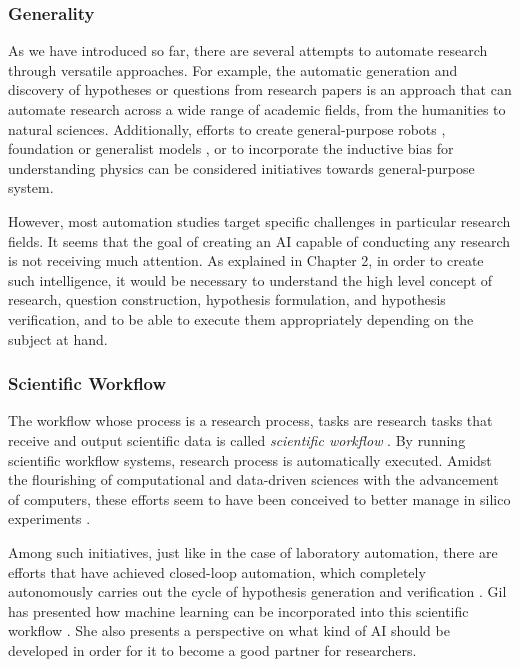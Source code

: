 

\subsubsection{Generality}
As we have introduced so far, there are several attempts to automate research through versatile approaches. For example, the automatic generation and discovery of hypotheses \cite{kang2022augmenting,chan2018solvent,wang2023learning,xu2023exploring} or questions \cite{lahat2023evaluating,liu2023creative,oppenlaender2023mapping,surita2020can} from research papers is an approach that can automate research across a wide range of academic fields, from the humanities to natural sciences. Additionally, efforts to create general-purpose robots  \cite{yachie2017robotic}, foundation or generalist models \cite{singhal2023towards,taylor2022galactica}, or to incorporate the inductive bias for understanding physics can be considered initiatives towards general-purpose system.

However, most automation studies target specific challenges in particular research fields. It seems that the goal of creating an AI capable of conducting any research is not receiving much attention. As explained in Chapter 2, in order to create such intelligence, it would be necessary to understand the high level concept of research, question construction, hypothesis formulation, and hypothesis verification, and to be able to execute them appropriately depending on the subject at hand.

\subsubsection{Scientific Workflow}
The workflow whose process is a research process, tasks are research tasks that receive and output scientific data is called \textit{scientific workflow} \cite{ludascher2009scientific}. By running scientific workflow systems, research process is automatically executed.  Amidst the flourishing of computational and data-driven sciences with the advancement of computers, these efforts seem to have been conceived to better manage in silico experiments \cite{liew2016scientific}. 

Among such initiatives, just like in the case of laboratory automation, there are efforts that have achieved closed-loop automation, which completely autonomously carries out the cycle of hypothesis generation and verification \cite{gil2017towards}. Gil has presented how machine learning can be incorporated into this scientific workflow \cite{gil2022will}. She also presents a perspective on what kind of AI should be developed in order for it to become a good partner for researchers.

